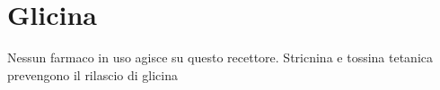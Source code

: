 
\section{Glicina}


Nessun farmaco in uso agisce su questo recettore. Stricnina e tossina tetanica prevengono il rilascio di glicina

\newpage